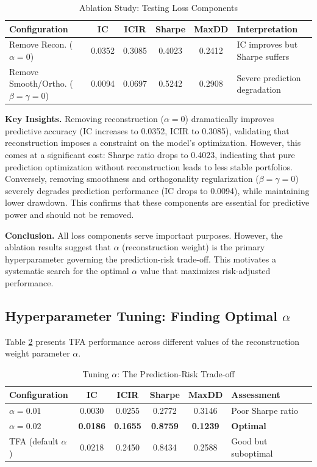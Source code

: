 \documentclass[12pt]{article}
\begin{document}
\begin{table}[ht!]
\centering
\caption{Ablation Study: Testing Loss Components}
\label{tab:ablation}
\small
\begin{tabular}{lccccp{3.2cm}}
\toprule
\textbf{Configuration} & \textbf{IC} & \textbf{ICIR} & \textbf{Sharpe} & \textbf{MaxDD} & \textbf{Interpretation} \\
\midrule
Remove Recon. ($\alpha=0$) & 0.0352 & 0.3085 & 0.4023 & 0.2412 & IC improves but Sharpe suffers \\
Remove Smooth/Ortho. ($\beta=\gamma=0$) & 0.0094 & 0.0697 & 0.5242 & 0.2908 & Severe prediction degradation \\
\bottomrule
\end{tabular}
\end{table}

\textbf{Key Insights.} Removing reconstruction ($\alpha=0$) dramatically improves predictive accuracy (IC increases to 0.0352, ICIR to 0.3085), validating that reconstruction imposes a constraint on the model's optimization. However, this comes at a significant cost: Sharpe ratio drops to 0.4023, indicating that pure prediction optimization without reconstruction leads to less stable portfolios. Conversely, removing smoothness and orthogonality regularization ($\beta=\gamma=0$) severely degrades prediction performance (IC drops to 0.0094), while maintaining lower drawdown. This confirms that these components are essential for predictive power and should not be removed.

\textbf{Conclusion.} All loss components serve important purposes. However, the ablation results suggest that $\alpha$ (reconstruction weight) is the primary hyperparameter governing the prediction-risk trade-off. This motivates a systematic search for the optimal $\alpha$ value that maximizes risk-adjusted performance.

\subsection{Hyperparameter Tuning: Finding Optimal $\alpha$}

Table \ref{tab:alpha_tuning} presents TFA performance across different values of the reconstruction weight parameter $\alpha$.

\begin{table}[ht!]
\centering
\caption{Tuning $\alpha$: The Prediction-Risk Trade-off}
\label{tab:alpha_tuning}
\begin{tabular}{lccccp{3cm}}
\toprule
\textbf{Configuration} & \textbf{IC} & \textbf{ICIR} & \textbf{Sharpe} & \textbf{MaxDD} & \textbf{Assessment} \\
\midrule
$\alpha=0.01$ & 0.0030 & 0.0255 & 0.2772 & 0.3146 & Poor Sharpe ratio \\
\textbf{$\alpha=0.02$} & \textbf{0.0186} & \textbf{0.1655} & \textbf{0.8759} & \textbf{0.1239} & \textbf{Optimal} \\
TFA (default $\alpha$) & 0.0218 & 0.2450 & 0.8434 & 0.2588 & Good but suboptimal \\
\bottomrule
\end{tabular}
\end{table}
\end{document}
